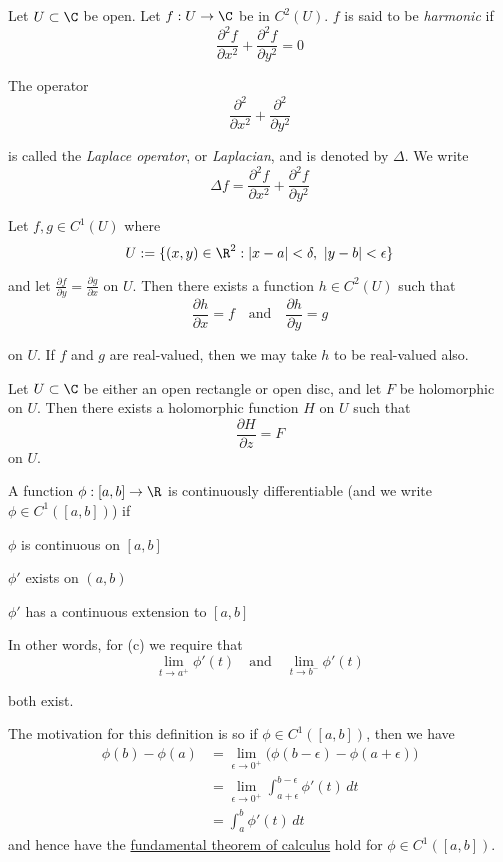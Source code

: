 \label{d53f60f}

Let $U\subset\C$ be open. Let $f:U\to\C$ be in $C^2(U)$. $f$ is said to be
\textit{harmonic} if
$$
  \frac{\partial^2f}{\partial x^2}+\frac{\partial^2f}{\partial y^2}=0
$$

The operator
$$
  \frac{\partial^2}{\partial x^2}+\frac{\partial^2}{\partial y^2}
$$

is called the \textit{Laplace operator}, or \textit{Laplacian}, and is denoted
by $\Delta$. We write
$$
  \Delta f=\frac{\partial^2f}{\partial x^2}+\frac{\partial^2f}{\partial y^2}
$$

\label{fdd4521}

Let $f,g\in C^1(U)$ where
$$
  U:=\{ (x,y)\in\R^2:|x-a|<\delta,\ |y-b|<\epsilon \}
$$

and let $\displaystyle\frac{\partial f}{\partial y}=\frac{\partial g}{\partial
  x}$ on $U$. Then there exists a function $h\in C^2(U)$ such that
$$
  \frac{\partial h}{\partial x}=f
  \quad\text{and}\quad
  \frac{\partial h}{\partial y}=g
$$

on $U$. If $f$ and $g$ are real-valued, then we may take $h$ to be real-valued
also.

\label{e7808d1}

Let $U\subset\C$ be either an open rectangle or open disc, and let $F$ be
holomorphic on $U$. Then there exists a holomorphic function $H$ on $U$ such
that
$$
  \frac{\partial H}{\partial z}=F
$$
on $U$.

\label{c1f6d35}

A function $\phi:[a,b]\to\R$ is continuously differentiable (and we write
$\phi\in C^1([a,b])$) if

\begin{enumerata}
  \item $\phi$ is continuous on $[a,b]$
  \item $\phi'$ exists on $(a,b)$
  \item $\phi'$ has a continuous extension to $[a,b]$
\end{enumerata}

In other words, for (c) we require that
$$
  \lim_{t\to a^+}\phi'(t)\quad\text{and}\quad\lim_{t\to b^-}\phi'(t)
$$

both exist.

The motivation for this definition is so if $\phi\in C^1([a,b])$, then we have
\begin{align*}
  \phi(b)-\phi(a)
   & =\lim_{\epsilon\to0^+}\big(\phi(b-\epsilon)-\phi(a+\epsilon)\big) \\
   & =\lim_{\epsilon\to0^+}\int_{a+\epsilon}^{b-\epsilon}\phi'(t)\,dt  \\
   & =\int_a^b\phi'(t)\,dt
\end{align*}
and hence have the \href{b869dc0}{fundamental theorem of calculus}
hold for $\phi\in C^1([a,b])$.


